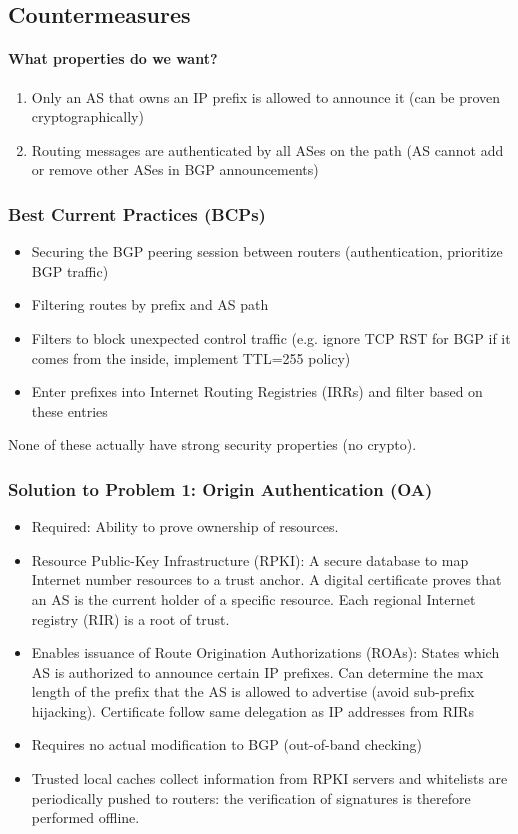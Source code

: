 \subsection{Countermeasures}
\paragraph{What properties do we want?}
\begin{enumerate}
    \item Only an AS that owns an IP prefix is allowed to announce it (can be proven cryptographically)
    \item Routing messages are authenticated by all ASes on the path (AS cannot add or remove other ASes in BGP announcements)
\end{enumerate}

\subsubsection{Best Current Practices (BCPs)}

\begin{itemize}
	\item Securing the BGP peering session between routers (authentication, prioritize BGP traffic)
	\item Filtering routes by prefix and AS path
	\item Filters to block unexpected control traffic (e.g. ignore TCP RST for BGP if it comes from the inside, implement TTL=255 policy)
	\item Enter prefixes into Internet Routing Registries (IRRs) and filter based on these entries
\end{itemize}

None of these actually have strong security properties (no crypto).

\subsubsection{Solution to Problem 1: Origin Authentication (OA)}
\begin{itemize}
    \item Required: Ability to prove ownership of resources.
    \item Resource Public-Key Infrastructure (RPKI): A secure database to map Internet number resources to a trust anchor. A digital certificate proves that an AS is the current holder of a specific resource. Each regional Internet registry (RIR) is a root of trust.
    \item Enables issuance of Route Origination Authorizations (ROAs): States which AS is authorized to announce certain IP prefixes. Can determine the max length of the prefix that the AS is allowed to advertise (avoid sub-prefix hijacking). Certificate follow same delegation as IP addresses from RIRs
    \item Requires no actual modification to BGP (out-of-band checking)
    \item Trusted local caches collect information from RPKI servers and whitelists are periodically pushed to routers: the verification of signatures is therefore performed offline.
\end{itemize}

